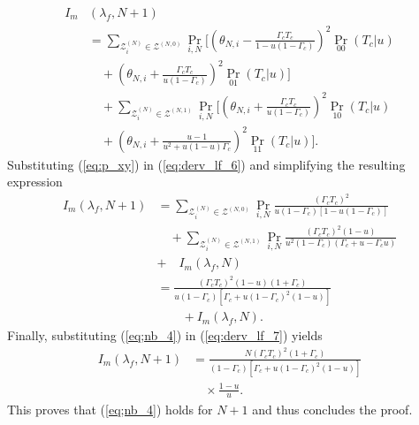 \documentclass[11pt,draftclsnofoot,journal,onecolumn]{IEEEtran}
\begin{document}
\begin{IEEEproof}
\begin{align}
I_m&(\lambda_f, N+1)\nonumber\\& = \sum_{\mathcal{Z}_{i}^{(N)} \in \mathcal{Z}^{(N,0)}} \textstyle\Pr_{i,N}\bigg[\left(\theta_{N,i}-\frac{\Gamma_c T_c}{1-u(1-\Gamma_c)}\right)^2 \textstyle\Pr_{00}(T_c|u)\nonumber\\&\quad + \left(\theta_{N,i}+\frac{\Gamma_c T_c}{u(1-\Gamma_c)}\right)^2 \textstyle\Pr_{01}(T_c|u)\bigg] \nonumber \\
&\quad + \sum_{\mathcal{Z}_{i}^{(N)} \in \mathcal{Z}^{(N,1)}} \textstyle \Pr_{i,N} \bigg[\left(\theta_{N,i}+\frac{\Gamma_c T_c}{u(1-\Gamma_c)}\right)^2 \textstyle\Pr_{10}(T_c|u)\nonumber\\&\quad + \left(\theta_{N,i}+\frac{u-1}{u^2 + u(1-u)\Gamma_c}\right)^2 \textstyle\Pr_{11}(T_c|u)\bigg].
\label{eq:derv_lf_6}
\end{align}
Substituting (\ref{eq:p_xy}) in (\ref{eq:derv_lf_6}) and simplifying the resulting expression
\begin{align}
I_m(\lambda_f,N+1) & = \sum_{\mathcal{Z}_{i}^{(N)} \in \mathcal{Z}^{(N,0)}} \textstyle \Pr_{i,N} \frac{(\Gamma_c T_c)^2}{u(1- \Gamma_c)[1- u(1 - \Gamma_c)]}\nonumber\\&\quad + \sum_{\mathcal{Z}_{i}^{(N)} \in \mathcal{Z}^{(N,1)}} \textstyle \Pr_{i,N} \frac{(\Gamma_c T_c)^2(1-u)}{u^2\left(1-\Gamma_c\right)(\Gamma_c+u-\Gamma_c u)} \nonumber \\&+\quad I_m(\lambda_f, N)\nonumber\\& = \frac{(\Gamma_c T_c)^2(1-u)(1+\Gamma_c)}{u(1-\Gamma_c)[\Gamma_c+u(1-\Gamma_c)^2(1-u)]}\nonumber\\&\qquad+ I_m(\lambda_f, N).
\label{eq:derv_lf_7}
\end{align}
Finally, substituting (\ref{eq;nb_4}) in (\ref{eq:derv_lf_7}) yields
\begin{align}
I_m(\lambda_f,N+1) & = \frac{N(\Gamma_c T_c)^2(1+\Gamma_c)}{(1-\Gamma_c)[\Gamma_c+u(1-\Gamma_c)^2(1-u)]}\nonumber\\&\quad\times\frac{1-u}{u}.
\label{eq:derv_lf_8}
\end{align}
This proves that (\ref{eq;nb_4}) holds for $N+1$ and thus concludes the proof.
\end{IEEEproof}
\end{document}
